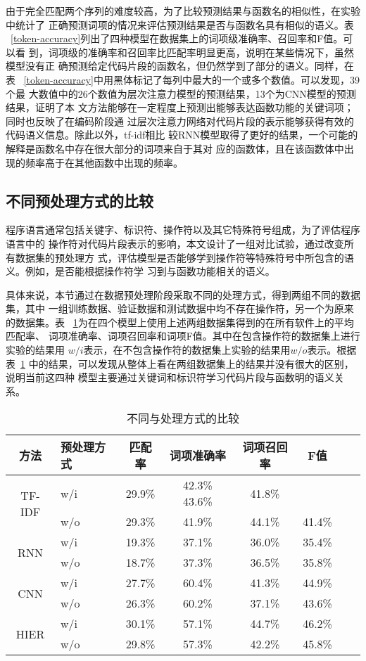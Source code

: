 由于完全匹配两个序列的难度较高，为了比较预测结果与函数名的相似性，在实验中统计了
正确预测词项的情况来评估预测结果是否与函数名具有相似的语义。表
~\ref{token-accuracy}列出了四种模型在数据集上的词项级准确率、召回率和F值。可以看
到，词项级的准确率和召回率比匹配率明显更高，说明在某些情况下，虽然模型没有正
确预测给定代码片段的函数名，但仍然学到了部分的语义。同样，在表
~\ref{token-accuracy}中用黑体标记了每列中最大的一个或多个数值。可以发现，39个最
大数值中的26个数值为层次注意力模型的预测结果，13个为CNN模型的预测结果，证明了本
文方法能够在一定程度上预测出能够表达函数功能的关键词项；同时也反映了在编码阶段通
过层次注意力网络对代码片段的表示能够获得有效的代码语义信息。除此以外，tf-idf相比
较RNN模型取得了更好的结果，一个可能的解释是函数名中存在很大部分的词项来自于其对
应的函数体，且在该函数体中出现的频率高于在其他函数中出现的频率。

\subsection{不同预处理方式的比较}
程序语言通常包括关键字、标识符、操作符以及其它特殊符号组成，为了评估程序语言中的
操作符对代码片段表示的影响，本文设计了一组对比试验，通过改变所有数据集的预处理方
式，评估模型是否能够学到操作符等特殊符号中所包含的语义。例如，是否能根据操作符学
习到与函数功能相关的语义。

具体来说，本节通过在数据预处理阶段采取不同的处理方式，得到两组不同的数据集，其中
一组训练数据、验证数据和测试数据中均不存在操作符，另一个为原来的数据集。表
~\ref{operator}为在四个模型上使用上述两组数据集得到的在所有软件上的平均匹配率、
词项准确率、词项召回率和词项F值。其中在包含操作符的数据集上进行实验的结果用
$w/i$表示，在不包含操作符的数据集上实验的结果用$w/o$表示。根据表~\ref{operator}
中的结果，可以发现从整体上看在两组数据集上的结果并没有很大的区别，说明当前这四种
模型主要通过关键词和标识符学习代码片段与函数明的语义关系。

\begin{table}[!t]
    \scriptsize
\renewcommand{\arraystretch}{1.4}
\caption{不同与处理方式的比较}
\label{operator}
\centering
\begin{tabular}{cl|cccccc}
\toprule
 方法 &预处理方式 &匹配率 &词项准确率 &词项召回率 &F值\\ 
\hline
\multirow{2}{*}{TF-IDF}&w/i&29.9\%&42.3\% 43.6\% &41.8\% \\ 
&w/o&29.3\% &41.9\% &44.1\% &41.4\% \\ 
\hline
\multirow{2}{*}{RNN}&w/i&19.3\% &37.1\% &36.0\%  &35.4\% \\ 
&w/o&18.7\% &37.3\% &36.5\% &35.8\% \\

\hline
\multirow{2}{*}{CNN}&w/i& 27.7\% &60.4\% &41.3\% &44.9\% \\ 
&w/o&26.3\% &60.2\% &37.1\% &43.6\% \\
\hline
\multirow{2}{*}{HIER}&w/i&30.1\% &57.1\% &44.7\% &46.2\% \\
&w/o&29.8\% &57.3\% &42.2\% &45.8\% \\
\bottomrule
\end{tabular}
\end{table}

